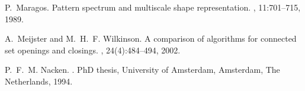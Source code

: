 \documentclass{sciposter}
\begin{document}
\begin{multicols}{3}
\begin{thebibliography}{1}
P.~Maragos.
\newblock Pattern spectrum and multiscale shape representation.
, 11:701--715, 1989.

A.~Meijster and M.~H.~F. Wilkinson.
\newblock A comparison of algorithms for connected set openings and closings.
, 24(4):484--494, 2002.

P.~F.~M. Nacken.
.
\newblock PhD thesis, University of Amsterdam, Amsterdam, The Netherlands,
  1994.

\end{thebibliography}

\end{multicols}
\end{document}
